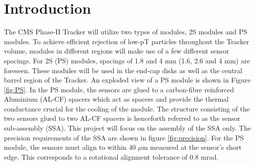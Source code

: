 \documentclass[fleqn,10pt]{SelfArx} %
\affiliation{\textsuperscript{1}\textit{DESY, Hamburg Germany}} %
\affiliation{*\textbf{} james.keaveney@desy.de} %
\begin{document}
\flushbottom %

\maketitle %

\tableofcontents %

\thispagestyle{empty} %


\section*{Introduction} %




The CMS Phase-II Tracker will utilize two types of modules, 2S modules and PS modules. To achieve efficient rejection of low-pT particles throughout the Tracker volume, modules in different regions will make use of a few different sensor spacings. For 2S (PS) modules, spacings of 1.8 and 4 mm (1.6, 2.6 and 4 mm) are foreseen. These modules will be used in the end-cap disks as well as the central barrel region of the Tracker. An exploded view of a PS module is shown in Figure \ref{fig:PS}. In the PS module, the sensors are glued to a carbon-fibre reinforced Aluminium (AL-CF) spacers which act as spacers and provide the thermal conductance crucial for the cooling of the module. The structure consisting of the two sensors glued to two AL-CF spacers is henceforth referred to as the sensor sub-assembly (SSA). This project will focus on the assembly of the SSA only. The precision requirements of the SSA are shown in figure \ref{fig:precision}. For the PS module, the sensors must align to within 40 $\mu$m measured at the sensor's short edge. This corresponds to a rotational alignment tolerance of 0.8 mrad. 
\end{document}
